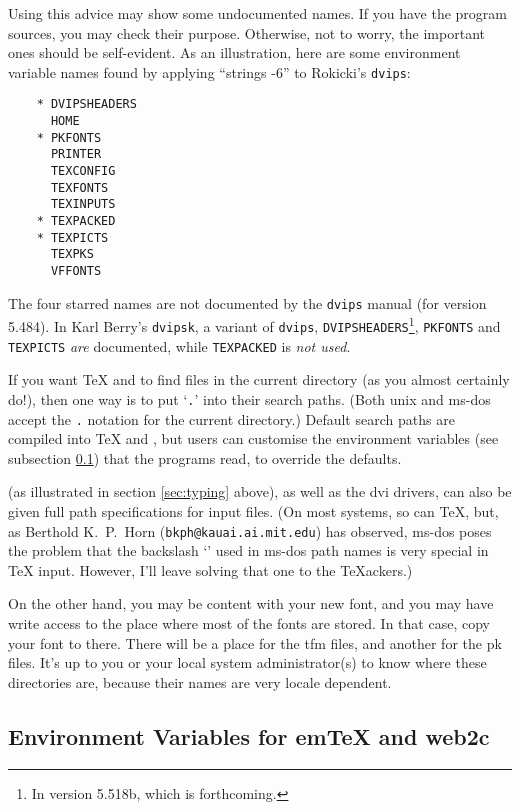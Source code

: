 Using this advice may show some undocumented names.
If you have the program sources, you may check their purpose.
Otherwise, not to worry, the important ones should be self-evident.
As an illustration, here are some environment variable names found by
applying ``strings -6'' to {\sc Rokicki's} {\tt dvips}:
\begin{verbatim}
    * DVIPSHEADERS
      HOME
    * PKFONTS
      PRINTER
      TEXCONFIG
      TEXFONTS
      TEXINPUTS
    * TEXPACKED
    * TEXPICTS
      TEXPKS
      VFFONTS
\end{verbatim}
The four starred names are not documented by the {\tt dvips} manual
(for version 5.484).
In Karl {\sc Berry's} {\tt dvipsk}, a variant of {\tt dvips},
{\tt DVIPSHEADERS}\footnote{In version 5.518b, which is forthcoming.},
{\tt PKFONTS} and {\tt TEXPICTS} {\em are\/}
documented, while {\tt TEXPACKED} is {\em not used}.

If you want \TeX{} and \MF{} to find files in the current directory
(as you almost certainly do!), then one way is to put `{\tt .}' into
their search paths.
(Both {\sc unix} and {\sc ms-dos} accept the {\tt .} notation
for the current directory.)
Default search paths are compiled into \TeX{} and \MF{}, but users
can customise the environment variables (see subsection \ref{sub:env})
that the programs read, to override the defaults.

\MF{} (as illustrated in section \ref{sec:typing} above),
as well as the {\sc dvi} drivers,
can also be given full path specifications for input files.
(On most systems, so can \TeX{}, but, as Berthold K.~P.~{\sc Horn}
({\tt bkph@kauai.ai.mit.edu}) has observed,
{\sc ms-dos} poses the problem that the backslash `\ttbsl{}'
used in {\sc ms-dos} path names is very special in \TeX{} input.
However, I'll leave solving that one to the \TeX{}ackers.)

On the other hand, you may be content with your new font, and you may
have write access to the place where most of the fonts are stored.  In
that case, copy your font to there.  There will be a place for the
{\sc tfm} files, and another for the {\sc pk} files.  It's up to you
or your local system administrator(s) to know where these directories
are, because their names are very locale dependent.


\subsection{Environment Variables for em\TeX{} and {\sf web2c}}%
\label{sub:env}

